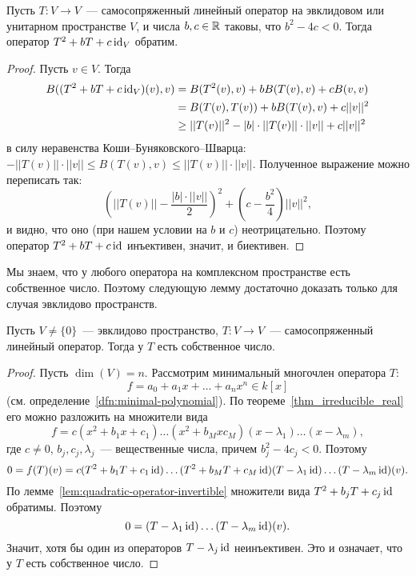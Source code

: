 \begin{lemma}\label{lem:quadratic-operator-invertible}
Пусть $T\colon V\to V$~--- самосопряженный линейный оператор
на эвклидовом или унитарном пространстве $V$,
и числа $b,c\in\mathbb R$ таковы, что $b^2-4c<0$.
Тогда оператор $T^2 + bT + c\operatorname{id}_V$ обратим.
\end{lemma}
\begin{proof}
Пусть $v\in V$. Тогда
\begin{align*}
B((T^2 + bT + c\operatorname{id}_V)(v),v) &= B(T^2(v),v) + bB(T(v),v) + cB(v,v) \\
&= B(T(v),T(v)) + bB(T(v),v) + c||v||^2 \\
&\geq ||T(v)||^2 - |b|\cdot ||T(v)||\cdot ||v|| + c||v||^2
\end{align*}
в силу неравенства Коши--Буняковского--Шварца:
$-||T(v)||\cdot ||v|| \leq B(T(v),v) \leq ||T(v)||\cdot ||v||$.
Полученное выражение можно переписать так:
$$
\left(||T(v)|| - \frac{|b|\cdot ||v||}{2}\right)^2 +
\left(c-\frac{b^2}{4}\right)||v||^2,
$$
и видно, что оно (при нашем условии на $b$ и $c$) неотрицательно.
Поэтому оператор $T^2 + bT + c\operatorname{id}$ инъективен, значит, и биективен.
\end{proof}

\begin{remark}
Мы знаем, что у любого оператора на комплексном пространстве есть
собственное число.
Поэтому следующую лемму достаточно доказать только для случая
эвклидово пространств.
\end{remark}

\begin{lemma}\label{lem:real-self-adjoint-has-eigenvalue}
Пусть $V \neq \{0\}$~--- эвклидово пространство, $T\colon V\to V$~---
самосопряженный линейный оператор. Тогда у $T$ есть собственное
число.
\end{lemma}
\begin{proof}
Пусть $\dim(V) = n$. Рассмотрим минимальный многочлен оператора $T$:
$$
f = a_0 + a_1x + \dots + a_nx^n \in k[x]
$$
(см. определение~\ref{dfn:minimal-polynomial}).
По теореме~\ref{thm_irreducible_real} его можно разложить на множители
вида
$$
f = c(x^2 + b_1x + c_1)\dots (x^2 + b_Mx c_M)
(x-\lambda_1)\dots(x-\lambda_m),
$$
где $c\neq 0$, $b_j,c_j,\lambda_j$~--- вещественные числа, причем
$b_j^2 - 4c_j < 0$. Поэтому
$$
0 = f(T)(v) = c(T^2 + b_1T + c_1\operatorname{id})\dots(T^2+b_MT+c_M\operatorname{id})
(T-\lambda_1\operatorname{id})\dots(T-\lambda_m\operatorname{id})(v).
$$
По лемме~\ref{lem:quadratic-operator-invertible} множители вида
$T^2 + b_jT + c_j\operatorname{id}$ обратимы. Поэтому
$$
0 = (T-\lambda_1\operatorname{id})\dots (T-\lambda_m\operatorname{id})(v).
$$
Значит, хотя бы один из операторов $T-\lambda_j\operatorname{id}$ неинъективен.
Это и означает, что у $T$ есть собственное число.
\end{proof}

